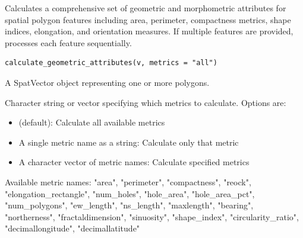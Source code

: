 \documentclass[letterpaper]{book}
\begin{document}
%
\begin{Description}
Calculates a comprehensive set of geometric and morphometric attributes for
spatial polygon features including area, perimeter, compactness metrics,
shape indices, elongation, and orientation measures. If multiple features are
provided, processes each feature sequentially.
\end{Description}
%
\begin{Usage}
\begin{verbatim}
calculate_geometric_attributes(v, metrics = "all")
\end{verbatim}
\end{Usage}
%
\begin{Arguments}
\begin{ldescription}
\item[\code{v}] A SpatVector object representing one or more polygons.

\item[\code{metrics}] Character string or vector specifying which metrics to calculate.
Options are:
\begin{itemize}

\item{}  (default): Calculate all available metrics
\item{} A single metric name as a string: Calculate only that metric
\item{} A character vector of metric names: Calculate specified metrics

\end{itemize}

Available metric names: "area", "perimeter", "compactness", "reock",
"elongation\_rectangle", "num\_holes", "hole\_area", "hole\_area\_pct",
"num\_polygons", "ew\_length", "ns\_length", "maxlength", "bearing",
"northerness", "fractaldimension", "sinuosity", "shape\_index",
"circularity\_ratio", "decimallongitude", "decimallatitude"
\end{ldescription}
\end{Arguments}
%
\end{document}
